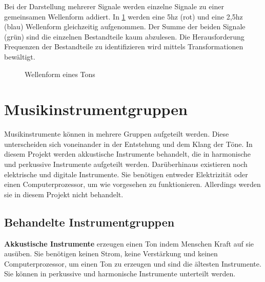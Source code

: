 \par

Bei der Darstellung mehrerer Signale werden einzelne Signale zu einer gemeinsamen Wellenform addiert.
In \cref{wav_multiple_sounds} werden eine 5hz (rot) und eine 2,5hz (blau) Wellenform gleichzeitig aufgenommen.
Der Summe der beiden Signale (grün) sind die einzelnen Bestandteile kaum abzulesen.
Die Herausforderung Frequenzen der Bestandteile zu identifizieren wird mittels Transformationen bewältigt.

%
\begin{figure}[h]
    \centering
    \caption{Wellenform eines Tons}
    \label{wav_multiple_sounds}
\end{figure}
%

%
\section{Musikinstrumentgruppen}
\label{instrument_groups}
%

Musikinstrumente können in mehrere Gruppen aufgeteilt werden.
Diese unterscheiden sich voneinander in der Entstehung und dem Klang der Töne.
In diesem Projekt werden akkustische Instrumente behandelt, die in harmonische und perkussive Instrumente aufgeteilt werden.
Darüberhinaus existieren noch elektrische und digitale Instrumente.
Sie benötigen entweder Elektrizität oder einen Computerprozessor, um wie vorgesehen zu funktionieren.
Allerdings werden sie in diesem Projekt nicht behandelt.

\subsection{Behandelte Instrumentgruppen}

\textbf{Akkustische Instrumente} erzeugen einen Ton indem Menschen Kraft auf sie ausüben.
Sie benötigen keinen Strom, keine Verstärkung und keinen Computerprozessor, um einen Ton zu erzeugen und sind die ältesten Instrumente.
Sie können in perkussive und harmonische Instrumente unterteilt werden. 

